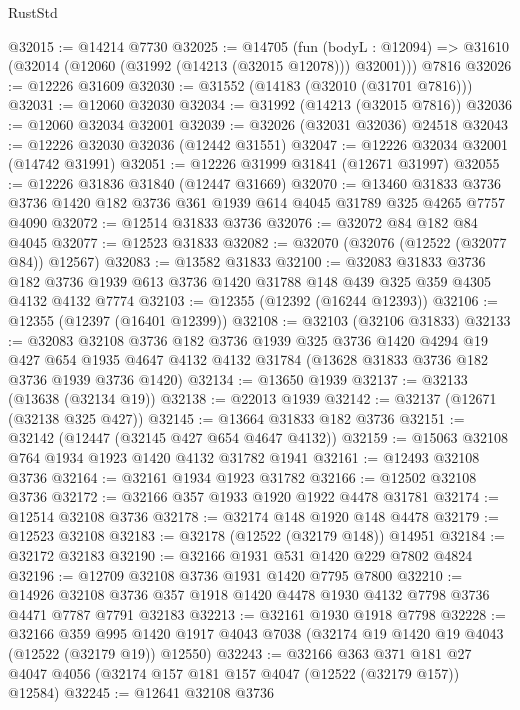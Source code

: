 \begin{lexlean}{RustStd}
\begin{coremodule}
@32015 := @14214 @7730
@32025 := @14705
    (fun (bodyL : @12094) => @31610 (@32014 (@12060 (@31992 (@14213 (@32015 @12078))) @32001)))
    @7816
@32026 := @12226 @31609
@32030 := @31552 (@14183 (@32010 (@31701 @7816)))
@32031 := @12060 @32030
@32034 := @31992 (@14213 (@32015 @7816))
@32036 := @12060 @32034 @32001
@32039 := @32026 (@32031 @32036) @24518
@32043 := @12226 @32030 @32036 (@12442 @31551)
@32047 := @12226 @32034 @32001 (@14742 @31991)
@32051 := @12226 @31999 @31841 (@12671 @31997)
@32055 := @12226 @31836 @31840 (@12447 @31669)
@32070 := @13460
    @31833
    @3736
    @3736
    @1420
    @182
    @3736
    @361
    @1939
    @614
    @4045
    @31789
    @325
    @4265
    @7757
    @4090
@32072 := @12514 @31833 @3736
@32076 := @32072 @84 @182 @84 @4045
@32077 := @12523 @31833
@32082 := @32070 (@32076 (@12522 (@32077 @84)) @12567)
@32083 := @13582 @31833
@32100 := @32083
    @31833
    @3736
    @182
    @3736
    @1939
    @613
    @3736
    @1420
    @31788
    @148
    @439
    @325
    @359
    @4305
    @4132
    @4132
    @7774
@32103 := @12355 (@12392 (@16244 @12393))
@32106 := @12355 (@12397 (@16401 @12399))
@32108 := @32103 (@32106 @31833)
@32133 := @32083
    @32108
    @3736
    @182
    @3736
    @1939
    @325
    @3736
    @1420
    @4294
    @19
    @427
    @654
    @1935
    @4647
    @4132
    @4132
    @31784
    (@13628 @31833 @3736 @182 @3736 @1939 @3736 @1420)
@32134 := @13650 @1939
@32137 := @32133 (@13638 (@32134 @19))
@32138 := @22013 @1939
@32142 := @32137 (@12671 (@32138 @325 @427))
@32145 := @13664 @31833 @182 @3736
@32151 := @32142 (@12447 (@32145 @427 @654 @4647 @4132))
@32159 := @15063 @32108 @764 @1934 @1923 @1420 @4132 @31782 @1941
@32161 := @12493 @32108 @3736
@32164 := @32161 @1934 @1923 @31782
@32166 := @12502 @32108 @3736
@32172 := @32166 @357 @1933 @1920 @1922 @4478 @31781
@32174 := @12514 @32108 @3736
@32178 := @32174 @148 @1920 @148 @4478
@32179 := @12523 @32108
@32183 := @32178 (@12522 (@32179 @148)) @14951
@32184 := @32172 @32183
@32190 := @32166 @1931 @531 @1420 @229 @7802 @4824
@32196 := @12709 @32108 @3736 @1931 @1420 @7795 @7800
@32210 := @14926
    @32108
    @3736
    @357
    @1918
    @1420
    @4478
    @1930
    @4132
    @7798
    @3736
    @4471
    @7787
    @7791
    @32183
@32213 := @32161 @1930 @1918 @7798
@32228 := @32166
    @359
    @995
    @1420
    @1917
    @4043
    @7038
    (@32174 @19 @1420 @19 @4043 (@12522 (@32179 @19)) @12550)
@32243 := @32166
    @363
    @371
    @181
    @27
    @4047
    @4056
    (@32174 @157 @181 @157 @4047 (@12522 (@32179 @157)) @12584)
@32245 := @12641 @32108 @3736

\end{coremodule}
\end{lexlean}
